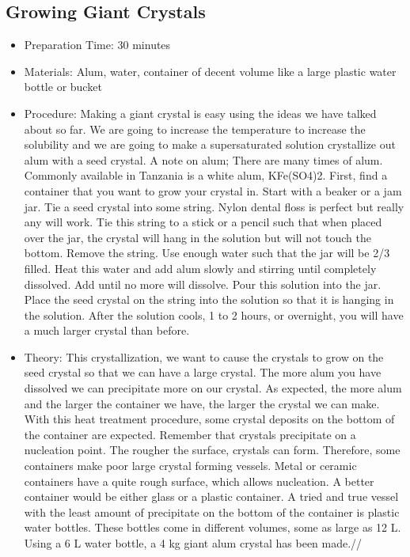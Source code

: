 \subsection{Growing Giant Crystals}
\begin{itemize}
\item{Preparation Time: 30 minutes}
\item{Materials: Alum, water, container of decent volume like a large plastic water bottle or bucket}
\item{Procedure: Making a giant crystal is easy using the ideas we have talked about so far. We are going to increase the temperature to increase the solubility and we are going to make a supersaturated solution crystallize out alum with a seed crystal. A note on alum; There are many times of alum. Commonly available in Tanzania is a white alum, KFe(SO4)2. First, find a container that you want to grow your crystal in. Start with a beaker or a jam jar. Tie a seed crystal into some string. Nylon dental floss is perfect but really any will work. Tie this string to a stick or a pencil such that when placed over the jar, the crystal will hang in the solution but will not touch the bottom. Remove the string. Use enough water such that the jar will be 2/3 filled. Heat this water and add alum slowly and stirring until completely dissolved. Add until no more will dissolve. Pour this solution into the jar. Place the seed crystal on the string into the solution so that it is hanging in the solution. After the solution cools, 1 to 2 hours, or overnight, you will have a much larger crystal than before. }
\item{Theory: This crystallization, we want to cause the crystals to grow on the seed crystal so that we can have a large crystal. The more alum you have dissolved we can precipitate more on our crystal. As expected, the more alum and the larger the container we have, the larger the crystal we can make. With this heat treatment procedure, some crystal deposits on the bottom of the container are expected. Remember that crystals precipitate on a nucleation point. The rougher the surface, crystals can form. Therefore, some containers make poor large crystal forming vessels. Metal or ceramic containers have a quite rough surface, which allows nucleation. A better container would be either glass or a plastic container. A tried and true vessel with the least amount of precipitate on the bottom of the container is plastic water bottles. These bottles come in different volumes, some as large as 12 L. Using a 6 L water bottle, a 4 kg giant alum crystal has been made.//
}
\end{itemize}

